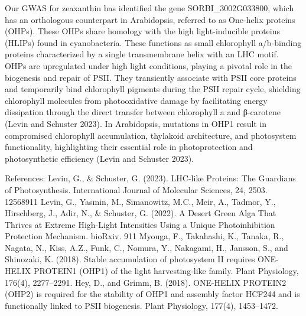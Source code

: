 \documentclass[10pt,letterpaper]{article}
\begin{document}
Our GWAS for zeaxanthin has identified the gene SORBI\_3002G033800, which has an orthologous counterpart in Arabidopsis, referred to as One-helix proteins (OHPs). These OHPs share homology with the high light-inducible proteins (HLIPs) found in cyanobacteria. These functions as small chlorophyll a/b-binding proteins characterized by a single transmembrane helix with an LHC motif. OHPs are upregulated under high light conditions, playing a pivotal role in the biogenesis and repair of PSII. They transiently associate with PSII core proteins and temporarily bind chlorophyll pigments during the PSII repair cycle, shielding chlorophyll molecules from photooxidative damage by facilitating energy dissipation through the direct transfer between chlorophyll a and β-carotene (Levin and Schuster 2023). In Arabidopsis, mutations in OHP1 result in compromised chlorophyll accumulation, thylakoid architecture, and photosystem functionality, highlighting their essential role in photoprotection and photosynthetic efficiency (Levin and Schuster 2023).


References:
Levin, G., & Schuster, G. (2023). LHC-like Proteins: The Guardians of Photosynthesis. International Journal of Molecular Sciences, 24, 2503. 12568911
Levin, G., Yasmin, M., Simanowitz, M.C., Meir, A., Tadmor, Y., Hirschberg, J., Adir, N., & Schuster, G. (2022). A Desert Green Alga That Thrives at Extreme High-Light Intensities Using a Unique Photoinhibition Protection Mechanism. bioRxiv. 911
Myouga, F., Takahashi, K., Tanaka, R., Nagata, N., Kiss, A.Z., Funk, C., Nomura, Y., Nakagami, H., Jansson, S., and Shinozaki, K. (2018). Stable accumulation of photosystem II requires ONE-HELIX PROTEIN1 (OHP1) of the light harvesting-like family. Plant Physiology, 176(4), 2277–2291.
Hey, D., and Grimm, B. (2018). ONE-HELIX PROTEIN2 (OHP2) is required for the stability of OHP1 and assembly factor HCF244 and is functionally linked to PSII biogenesis. Plant Physiology, 177(4), 1453–1472.
\end{document}
